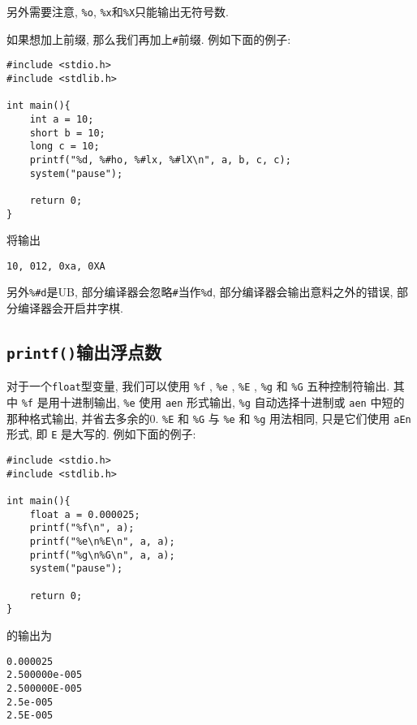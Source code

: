             另外需要注意, \texttt{\%o}, \texttt{\%x}和\texttt{\%X}只能输出无符号数.

            如果想加上前缀, 那么我们再加上\texttt{\#}前缀. 例如下面的例子:
\begin{lstlisting}
#include <stdio.h>
#include <stdlib.h>

int main(){
    int a = 10;
    short b = 10;
    long c = 10;
    printf("%d, %#ho, %#lx, %#lX\n", a, b, c, c);
    system("pause");

    return 0;
}
\end{lstlisting}
            将输出
\begin{lstlisting}
10, 012, 0xa, 0XA
\end{lstlisting}

            另外\texttt{\%\#d}是UB, 部分编译器会忽略\texttt{\#}当作\texttt{\%d}, 部分编译器会输出意料之外的错误, 部分编译器会开启井字棋.

        \subsection*{\texttt{printf()}输出浮点数}
            对于一个\texttt{float}型变量, 我们可以使用 \texttt{\%f} , \texttt{\%e} , \texttt{\%E} , \texttt{\%g} 和 \texttt{\%G} 五种控制符输出. 其中 \texttt{\%f} 是用十进制输出, \texttt{\%e} 使用 \texttt{aen} 形式输出, \texttt{\%g} 自动选择十进制或 \texttt{aen} 中短的那种格式输出, 并省去多余的0. \texttt{\%E} 和 \texttt{\%G} 与 \texttt{\%e} 和 \texttt{\%g} 用法相同, 只是它们使用 \texttt{aEn} 形式, 即 \texttt{E} 是大写的. 例如下面的例子:
\begin{lstlisting}
#include <stdio.h>
#include <stdlib.h>

int main(){
    float a = 0.000025;
    printf("%f\n", a);
    printf("%e\n%E\n", a, a);
    printf("%g\n%G\n", a, a);
    system("pause");

    return 0;
}
\end{lstlisting}
            的输出为
\begin{lstlisting}
0.000025
2.500000e-005
2.500000E-005
2.5e-005
2.5E-005
\end{lstlisting}

